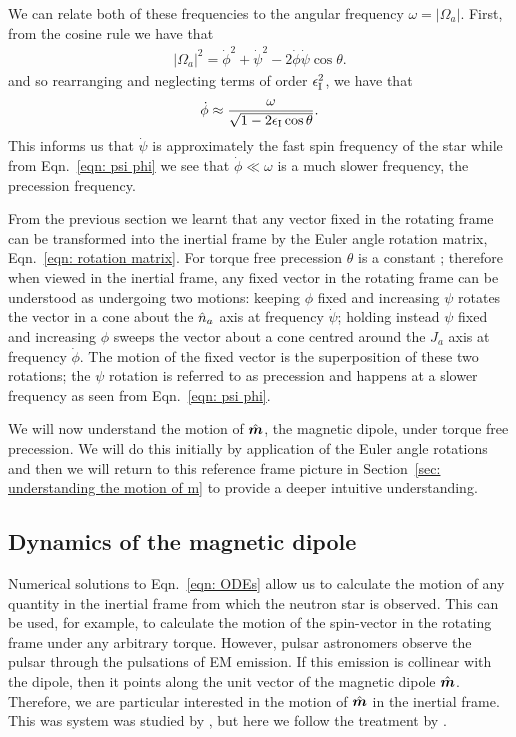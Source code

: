 \documentclass[../full_thesis/full_thesis.tex]{subfiles}
\begin{document}
We can relate both of these frequencies to the angular frequency $\omega = |\Omega_a|$.
First, from the cosine rule we have that
\begin{align}
|\Omega_a|^{2} = \dot{\phi}^{2}+\dot{\psi}^{2} - 2\dot{\phi}\dot{\psi}\cos\theta.
\end{align}
and so rearranging and neglecting terms of order $\epsilon_{\mathrm{I}}^{2}$, we have that
\begin{align}
\dot{\phi} \approx \frac{\omega}{\sqrt{1- 2\epsilon_{\mathrm{I}}\cos\theta}}.
\label{eqn: phi dot}
\end{align}
This informs us that $\dot{\psi}$ is approximately the fast spin frequency
of the star while from Eqn.~\eqref{eqn: psi phi} we see that $\dot{\phi} \ll \omega$
is a much slower frequency, the precession frequency.

From the previous section we learnt that any vector fixed in the rotating frame
can be transformed into the inertial frame by the Euler angle rotation matrix,
Eqn.~\eqref{eqn: rotation matrix}. For torque free precession $\theta$ is a
constant \citep{Landau1969}; therefore when viewed in the inertial frame, any
fixed vector in the rotating frame can be understood as undergoing two motions:
keeping $\phi$ fixed and increasing $\psi$ rotates the vector in a cone
about the $\hat{n}_{a}$ axis at frequency $\dot{\psi}$; holding
instead $\psi$ fixed and increasing $\phi$ sweeps the vector about a cone
centred around the $\hat{J}_a$ axis at frequency
$\dot{\phi}$. The motion of the fixed vector is the superposition of these two
rotations; the $\psi$ rotation is referred to as precession and happens at a
slower frequency as seen from Eqn.~\eqref{eqn: psi phi}.

We will now understand the motion of $\hat{\boldsymbol{m}}$, the magnetic dipole, under torque
free precession. We will do this initially by application of the Euler angle
rotations and then we will return to this reference frame picture in
Section~\ref{sec: understanding the motion of m} to provide a deeper intuitive
understanding.

\subsection{Dynamics of the magnetic dipole}

Numerical solutions to Eqn.~\eqref{eqn: ODEs} allow us to calculate the motion
of any quantity in the inertial frame from which the neutron star is observed.
This can be used, for example, to calculate the motion of the spin-vector in the
rotating frame under any arbitrary torque. However, pulsar astronomers observe the pulsar
through the pulsations of EM emission. If this emission is collinear with the
dipole, then it points along the unit vector of the magnetic dipole $\hat{\boldsymbol{m}}$. Therefore,
we are particular interested in the motion of $\hat{\boldsymbol{m}}$ in the inertial frame. This
was system was studied by \citet{bisnovatyi1990model}, but here we follow the
treatment by \citet{Jones2001}.
\end{document}
